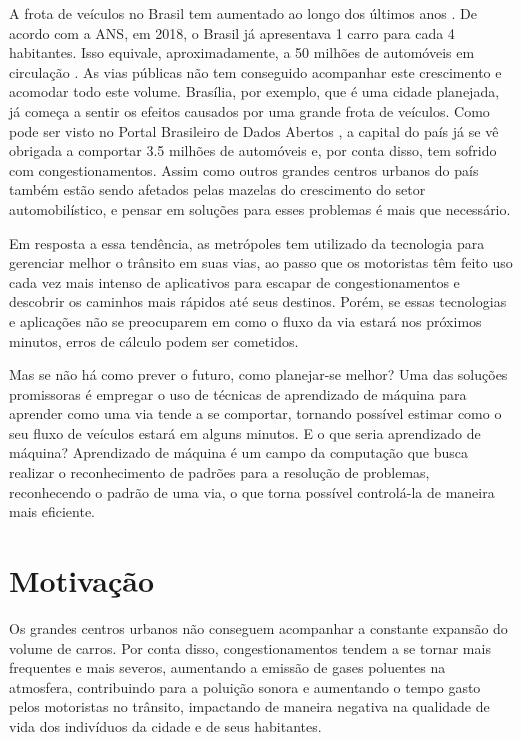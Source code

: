 A frota  de  veículos no Brasil tem aumentado ao longo  dos últimos anos \cite{mapa_moto2019v2}. De acordo com a \acrfull{ANS}, em 2018, o Brasil já apresentava 1 carro para cada 4 habitantes. Isso equivale, aproximadamente, a 50 milhões de automóveis em circulação \cite{G1}. As vias públicas não tem conseguido acompanhar este crescimento e acomodar todo este volume. Brasília, por exemplo, que é uma cidade planejada, já começa a sentir os efeitos causados por uma grande frota de veículos. Como pode ser visto no Portal Brasileiro de Dados Abertos \cite{detran_2018}, a capital do país já se vê obrigada a comportar 3.5 milhões de automóveis e, por conta disso, tem sofrido com congestionamentos. Assim como outros grandes centros urbanos do país também estão sendo afetados pelas mazelas do crescimento do setor automobilístico, e pensar em soluções para esses problemas é mais que necessário.

Em resposta a essa tendência, as metrópoles tem utilizado da tecnologia para gerenciar melhor o trânsito em suas vias, ao passo que os motoristas têm feito uso cada vez mais intenso de aplicativos para escapar de congestionamentos e descobrir os caminhos mais rápidos até seus destinos. Porém, se essas tecnologias e aplicações não se preocuparem em como o fluxo da via estará nos próximos minutos, erros de cálculo podem ser cometidos.

Mas se não há como prever o futuro, como planejar-se melhor? Uma das soluções promissoras é empregar o uso de técnicas de aprendizado de máquina para aprender como uma via tende a se comportar, tornando possível estimar como o seu fluxo de veículos estará em alguns minutos. E o que seria aprendizado de máquina? Aprendizado de máquina é um campo da computação que busca realizar o reconhecimento de padrões para a resolução de problemas, reconhecendo o padrão de uma via, o que torna possível controlá-la de maneira mais eficiente.

\section{Motivação}

Os grandes centros urbanos não conseguem acompanhar a constante expansão do volume de carros. Por conta disso, congestionamentos tendem a se tornar mais frequentes e mais severos, aumentando a emissão de gases poluentes na atmosfera, contribuindo para a poluição sonora e aumentando o tempo gasto pelos motoristas no trânsito, impactando de maneira negativa na qualidade de vida dos indivíduos da cidade e de seus habitantes.

